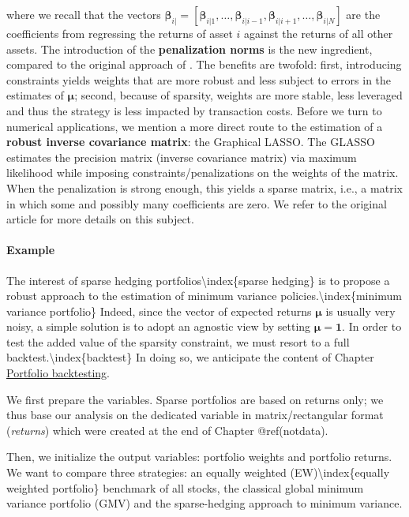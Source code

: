 where we recall that the vectors $\mathbf{\beta}_{i|}=[\mathbf{\beta}_{i|1},\dots,\mathbf{\beta}_{i|i -1},\mathbf{\beta}_{i|i+1},\dots,\mathbf{\beta}_{i|N}]$ are the coefficients from regressing the returns of asset $i$ against the returns of all other assets.\newline
The introduction of the \textbf{penalization norms} is the new ingredient, compared to the original approach of \cite{stevens1998inverse}. The benefits are twofold: first, introducing constraints yields weights that are more robust and less subject to errors in the estimates of $\mathbf{\mu}$; second, because of sparsity, weights are more stable, less leveraged and thus the strategy is less impacted by transaction costs. Before we turn to numerical applications, we mention a more direct route to the estimation of a \textbf{robust inverse covariance matrix}: the Graphical LASSO. The GLASSO estimates the precision matrix (inverse covariance matrix) via maximum likelihood while imposing constraints/penalizations on the weights of the matrix. When the penalization is strong enough, this yields a sparse matrix, i.e., a matrix in which some and possibly many coefficients are zero. We refer to the original article \cite{friedman2008sparse} for more details on this subject.

\paragraph{Example}\label{sparseex}

The interest of sparse hedging portfolios{\textbackslash}index\{sparse hedging\} is to propose a robust approach to the estimation of minimum variance policies.{\textbackslash}index\{minimum variance portfolio\} Indeed, since the vector of expected returns $\boldsymbol{\mu}$ is usually very noisy, a simple solution is to adopt an agnostic view by setting $\boldsymbol{\mu}=\boldsymbol{1}$. In order to test the added value of the sparsity constraint, we must resort to a full backtest.{\textbackslash}index\{backtest\} In doing so, we anticipate the content of Chapter \href{/chap-15-portfolio-backtesting}{Portfolio backtesting}.

We first prepare the variables. Sparse portfolios are based on returns only; we thus base our analysis on the dedicated variable in matrix/rectangular format (\textit{returns}) which were created at the end of Chapter @ref(notdata).

Then, we initialize the output variables: portfolio weights and portfolio returns. We want to compare three strategies: an equally weighted (EW){\textbackslash}index\{equally weighted portfolio\} benchmark of all stocks, the classical global minimum variance portfolio (GMV) and the sparse-hedging approach to minimum variance.

